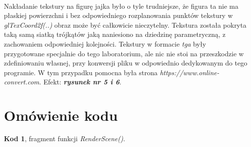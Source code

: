 \documentclass[polish,polish,a4paper]{article}
\begin{document}
\\\indent Nakładanie tekstury na figurę jajka było o tyle trudniejsze, że figura ta nie ma płaskiej powierzchni i bez odpowiedniego rozplanowania punktów tekstury w \textit{glTexCoord2f(..)} obraz może być całkowicie nieczytelny. Tekstura została pokryta taką samą siatką trójkątów jaką naniesiono na dziedzinę parametryczną, z zachowaniem odpowiedniej kolejności. Tekstury w formacie \textit{tga} były przygotowane specjalnie do tego laboratorium, ale nic nie stoi na przeszkodzie w zdefiniowaniu własnej, przy konwersji pliku w odpowiednio dedykowanym do tego programie. W tym przypadku pomocna była strona \textit{https://www.online-convert.com}. Efekt: \textbf{\textit{rysunek nr 5 i 6}}. 
  \section{Omówienie kodu}
   \textbf{Kod 1}, fragment funkcji \textit{RenderScene()}.
\end{document}
